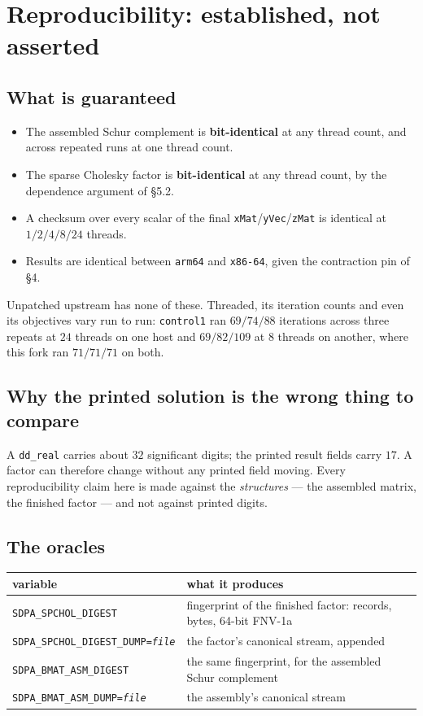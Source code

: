 \documentclass[11pt]{article}
\newcommand{\code}[1]{\texttt{#1}}
\begin{document}
\section{Reproducibility: established, not asserted}

\subsection{What is guaranteed}

\begin{itemize}
\item The assembled Schur complement is \textbf{bit-identical} at any thread count, and across
      repeated runs at one thread count.
\item The sparse Cholesky factor is \textbf{bit-identical} at any thread count, by the dependence
      argument of \S5.2.
\item A checksum over every scalar of the final \code{xMat}/\code{yVec}/\code{zMat} is identical at
      $1/2/4/8/24$ threads.
\item Results are identical between \code{arm64} and \code{x86-64}, given the contraction pin of
      \S4.
\end{itemize}

Unpatched upstream has none of these. Threaded, its iteration counts and even its objectives vary
run to run: \code{control1} ran $69/74/88$ iterations across three repeats at $24$ threads on one
host and $69/82/109$ at $8$ threads on another, where this fork ran $71/71/71$ on both.

\subsection{Why the printed solution is the wrong thing to compare}

A \code{dd\_real} carries about $32$ significant digits; the printed result fields carry $17$. A
factor can therefore change without any printed field moving. Every reproducibility claim here is
made against the \emph{structures} --- the assembled matrix, the finished factor --- and not
against printed digits.

\subsection{The oracles}

\begin{center}\small
\begin{tabular}{@{}p{5.6cm}p{7.6cm}@{}}
\toprule
variable & what it produces \\
\midrule
\code{SDPA\_SPCHOL\_DIGEST}          & fingerprint of the finished factor: records, bytes, 64-bit FNV-1a \\
\code{SDPA\_SPCHOL\_DIGEST\_DUMP=\emph{file}} & the factor's canonical stream, appended \\
\code{SDPA\_BMAT\_ASM\_DIGEST}       & the same fingerprint, for the assembled Schur complement \\
\code{SDPA\_BMAT\_ASM\_DUMP=\emph{file}} & the assembly's canonical stream \\
\bottomrule
\end{tabular}
\end{center}
\end{document}
